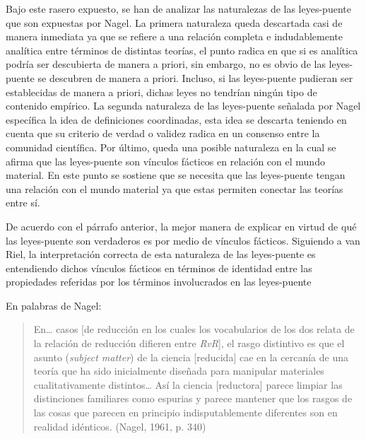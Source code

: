 \documentclass[]{book}
\begin{document}
\begin{refsection}
Bajo este rasero expuesto, se han de analizar las naturalezas de las
leyes-puente que son expuestas por Nagel. La primera naturaleza queda
descartada casi de manera inmediata ya que se refiere a una relación
completa e indudablemente analítica entre términos de distintas teorías,
el punto radica en que si es analítica podría ser descubierta de manera
a priori, sin embargo, no es obvio de las leyes-puente se descubren de
manera a priori. Incluso, si las leyes-puente pudieran ser establecidas
de manera a priori, dichas leyes no tendrían ningún tipo de contenido
empírico. La segunda naturaleza de las leyes-puente señalada por Nagel
específica la idea de definiciones coordinadas, esta idea se descarta
teniendo en cuenta que su criterio de verdad o validez radica en un
consenso entre la comunidad científica. Por último, queda una posible
naturaleza en la cual se afirma que las leyes-puente son vínculos
fácticos en relación con el mundo material. En este punto se sostiene
que se necesita que las leyes-puente tengan una relación con el mundo
material ya que estas permiten conectar las teorías entre sí.

De acuerdo con el párrafo anterior, la mejor manera de explicar en
virtud de qué las leyes-puente son verdaderos es por medio de vínculos
fácticos. Siguiendo a van Riel, la interpretación correcta de esta
naturaleza de las leyes-puente es entendiendo dichos vínculos fácticos
en términos de identidad entre las propiedades referidas por los
términos involucrados en las leyes-puente

En palabras de Nagel:

\begin{quote}
En\ldots{} casos {[}de reducción en los cuales los vocabularios de los
dos relata de la relación de reducción difieren entre \emph{RvR}{]}, el
rasgo distintivo es que el asunto (\emph{subject matter}) de la ciencia
{[}reducida{]} cae en la cercanía de una teoría que ha sido inicialmente
diseñada para manipular materiales cualitativamente distintos\ldots{}
Así la ciencia {[}reductora{]} parece limpiar las distinciones
familiares como espurias y parece mantener que los rasgos de las cosas
que parecen en principio indisputablemente diferentes son en realidad
idénticos. (Nagel, 1961, p. 340)
\end{quote}


\end{refsection}
\end{document}
